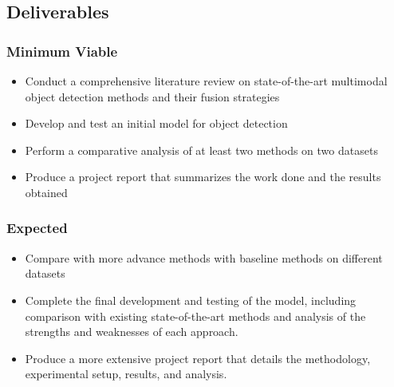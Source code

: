 \documentclass[rnd]{mas_proposal}
\begin{document}
\newpage
\subsection{Deliverables}
\subsubsection*{Minimum Viable}
\begin{itemize}
    \item Conduct a comprehensive literature review on state-of-the-art multimodal object detection methods and their fusion strategies
    \item Develop and test an initial model for object detection
    \item Perform a comparative analysis of at least two methods on two datasets
    \item Produce a project report that summarizes the work done and the results obtained
\end{itemize}

\subsubsection*{Expected}
\begin{itemize}
    \item Compare with more advance methods with baseline methods on different datasets
    \item  Complete the final development and testing of the model, including comparison with existing state-of-the-art methods and analysis of the strengths and weaknesses of each approach.
    \item Produce a more extensive project report that details the methodology, experimental setup, results, and analysis.
\end{itemize}
\end{document}
